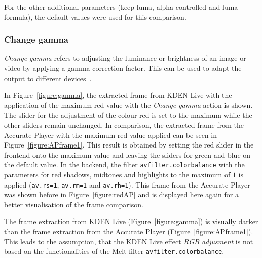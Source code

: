 \documentclass[../MasterThesis.tex]{subfiles}
\begin{document}
For the other additional parameters (keep luma, alpha controlled and luma formula), the default values were used for this comparison.












\subsubsection*{Change gamma}

\textit{Change gamma} refers to adjusting the luminance or brightness of an image or video by applying a gamma correction factor. This can be used to adapt the output to different devices~\cite{gamma}.

In Figure~\ref{figure:gamma}, the extracted frame from KDEN Live with the application of the maximum red value with the \textit{Change gamma} action is shown. The slider for the adjustment of the colour red is set to the maximum while the other sliders remain unchanged.
In comparison, the extracted frame from the Accurate Player with the maximum red value applied can be seen in Figure~\ref{figure:APframe1}. This result is obtained by setting the red slider in the frontend onto the maximum value and leaving the sliders for green and blue on the default value. In the backend, the filter \texttt{avfilter.colorbalance} with the parameters for red shadows, midtones and highlights to the maximum of $1$ is applied (\texttt{av.rs=1}, \texttt{av.rm=1} and \texttt{av.rh=1}).
This frame from the Accurate Player was shown before in Figure~\ref{figure:redAP} and is displayed here again for a better visualisation of the frame comparison.

The frame extraction from KDEN Live (Figure~\ref{figure:gamma}) is visually darker than the frame extraction from the Accurate Player (Figure~\ref{figure:APframe1}). This leads to the assumption, that the KDEN Live effect \textit{RGB adjusment} is not based on the functionalities of the Melt filter \texttt{avfilter.colorbalance}.
\end{document}
